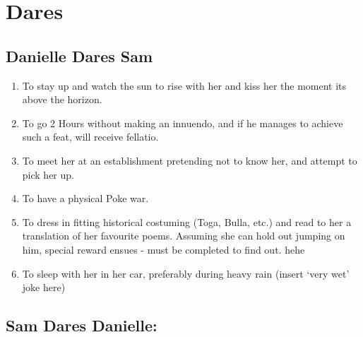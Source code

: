
 

 \section{Dares}

 \renewcommand{\theenumi}{\thesubsection.\arabic{enumi}}

   \subsection{Danielle Dares Sam}

\begin{enumerate}
\item  To stay up and watch the sun to rise with her and kiss her the moment its above the horizon.

\item  To go 2 Hours without making an innuendo, and if he manages to achieve such a feat, will receive fellatio.

\item  To meet her at an establishment pretending not to know her, and attempt to pick her up.

\item  To have a physical Poke war. 

\item  To dress in fitting historical costuming (Toga, Bulla, etc.) and read to her a translation of her favourite poems.  Assuming she can hold out  jumping on him, special reward ensues - must be completed to find out.  hehe 

\item  To sleep with her in her car, preferably during heavy rain (insert `very wet' joke here) 
\end{enumerate}

 

  \subsection{Sam Dares Danielle:}

